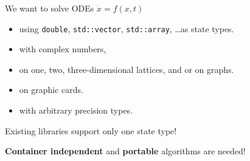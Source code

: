 


\begin{frame}[fragile]

 \vspace{2ex}

 We want to solve ODEs $\dot{x}=f(x,t)$
 \begin{itemize}
  \item using  {\tt double}, {\tt std::vector}, {\tt std::array}, \dots as state types.
  \item with complex numbers,
  \item on one, two, three-dimensional lattices, and or on graphs.
  \item on graphic cards.
  \item with arbitrary precision types.
 \end{itemize}

 \vspace{2ex}

Existing libraries support only one state type!

\vspace{4ex}
\centerline{\textbf{Container independent} and {\bf portable} algorithms are needed!}

\end{frame}







